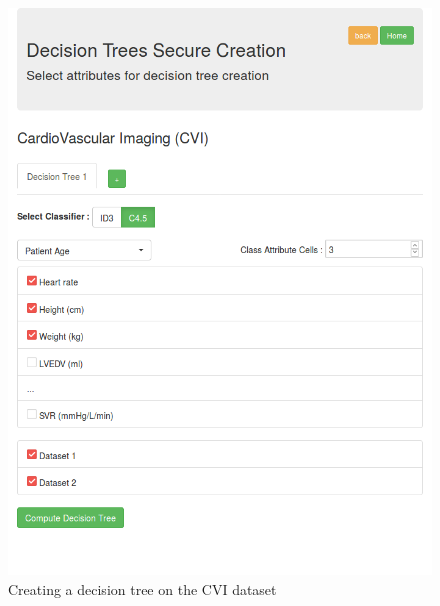 \begin{minipage}{0.47\textwidth}
  \begin{figure}[H]
  \includegraphics[width=\columnwidth]{figures/cvi_c45_1.png}
  \caption{Creating a decision tree on the CVI dataset}
  \label{f:cvi-c45-1}
\end{figure}
\end{minipage}
